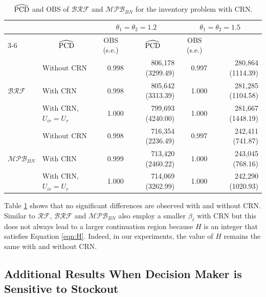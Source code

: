 \documentclass[11pt]{article}
\begin{document}
\begin{table}[h!] 
\centering
\renewcommand{\arraystretch}{0.9}
{\normalsize
\caption{$\widehat{{\rm PCD}}$ and OBS of $\mathcal{BRF}$ and $\mathcal{MPB}_{BN}$ for the inventory problem with CRN.}
\label{tab:CRNwith2constraints}
\begin{tabular}{llrrrr}
\hline
\multicolumn{2}{c}{\multirow{2}{*}{}} & \multicolumn{2}{c}{$\theta_1 = \theta_2 = 1.2$}                   & \multicolumn{2}{c}{$\theta_1 = \theta_2 = 1.5$}                   \\ \cline{3-6} 
\multicolumn{2}{c}{}                  & \multicolumn{1}{c}{$\widehat{{\rm PCD}}$} & \multicolumn{1}{c}{OBS (s.e.)} & \multicolumn{1}{c}{$\widehat{{\rm PCD}}$} & \multicolumn{1}{c}{OBS (s.e.)} \\ \hline
\multirow{3}{*}{$\mathcal{BRF}$} & Without CRN  & 0.998 & 806,178 (3299.49) & 0.997 & 280,864 (1114.39)  \\ 
                      & With CRN   & 0.998 & 805,642 (3313.39) & 1.000 & 281,285 (1104.58)  \\ 
                      & With CRN, $U_{ir}=U_r$ & 1.000 & 799,693 (4240.00) & 1.000 & 281,667 (1448.19) \\ \hline
\multirow{3}{*}{$\mathcal{MPB}_{BN}$}  & Without CRN     & 0.998  &  716,354 (2236.49)  & 0.997  & 242,411 (741.87)   \\ 
                      & With CRN  & 0.999 & 713,420 (2460.22) & 1.000  & 243,045 (768.16)  \\ 
                      & With CRN, $U_{ir}=U_r$ & 1.000 & 714,069 (3262.99) & 1.000 & 242,290 (1020.93)  \\ \hline
\end{tabular}
}
\end{table}

Table \ref{tab:CRNwith2constraints} shows that no significant differences are observed with and without CRN.
Similar to $\mathcal{RF}$, $\mathcal{BRF}$ and $\mathcal{MPB}_{BN}$ also employ a smaller $\beta_\ell$ with CRN but this does not always lead to a larger continuation region because $H$ is an integer that satisfies Equation \eqref{eqn:H}. Indeed, in our experiments, the value of $H$ remains the same with and without CRN. 

\subsection{Additional Results When Decision Maker is Sensitive to Stockout}
\label{sec:SensitiveStockout_Results}
\end{document}
